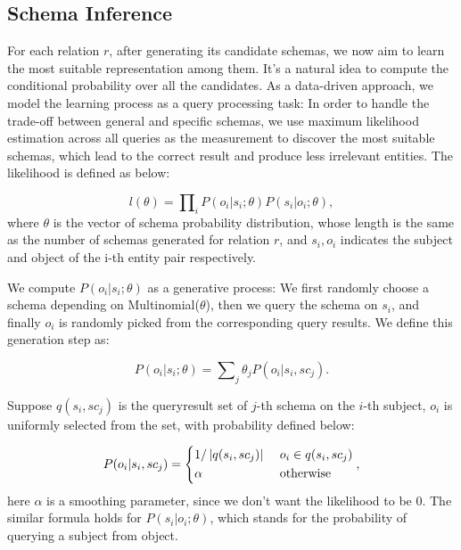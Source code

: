 \subsection{Schema Inference}
\label{sec:schema}


For each relation $r$, after generating its candidate schemas, we now aim to learn the most suitable representation among them. 
It's a natural idea to compute the conditional probability over all the candidates.
As a data-driven approach, we model the learning process as a query processing
task: 
In order to handle the trade-off between general and specific schemas, 
we use maximum likelihood estimation across
all queries as the measurement to discover the most suitable schemas, which lead to the correct result and produce less irrelevant entities.
The likelihood is defined as below:

\begin{equation}
l(\theta) = \prod\nolimits_{i} {P(o_i | s_i ; \theta) P(s_i | o_i ; \theta)},
\end{equation}
\noindent
where $\theta$ is the vector of schema probability distribution,
whose length is the same as the number of schemas generated for relation $r$,
and $s_i, o_i$ indicates the subject and object of the i-th entity pair respectively.

We compute $P(o_i | s_i ; \theta)$ as a generative process:
We first randomly choose a schema depending on Multinomial($\theta$), then we query the schema on $s_i$,
and finally $o_i$ is randomly picked from the corresponding query results.
We define this generation step as:

\begin{equation}
P(o_i | s_i ; \theta) = \sum\nolimits_{j} {\theta_j P(o_i | s_i, sc_j)}.
\end{equation}

Suppose $q(s_i, sc_j)$ is the queryresult set of $j$-th schema on 
the $i$-th subject, $o_i$ is uniformly selected from the set,
with probability defined below:

\begin{equation}
P(o_i | s_i, sc_j) = \left\{
  \begin{aligned}
  & 1 / \left| q(s_i, sc_j) \right| & ~ & o_i \in q(s_i, sc_j) \\
  & \alpha & ~ & \rm{otherwise} \\
  \end{aligned}
\right.,
\end{equation}
\noindent
here $\alpha$ is a smoothing parameter, 
since we don't want the likelihood to be 0.
The similar formula holds for $P(s_i | o_i ; \theta)$, 
which stands for the probability of querying a subject from object.

